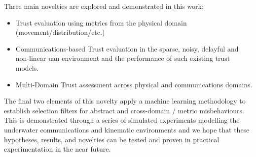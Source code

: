 Three main novelties are explored and demonstrated in this work;
\begin{itemize}
	\item Trust evaluation using metrics from the physical domain (movement/distribution/etc.)
	\item Communications-based Trust evaluation in the sparse, noisy, delayful and non-linear \gls{uan} environment and the performance of such existing trust models.
	\item Multi-Domain Trust assessment across physical and communications domains.
\end{itemize}

The final two elements of this novelty apply a machine learning methodology to establish selection filters for abstract and cross-domain / metric misbehaviours.
This is demonstrated through a series of simulated experiments modelling the underwater communications and kinematic environments and we hope that these hypotheses, results, and novelties can be tested and proven in practical experimentation in the near future.

